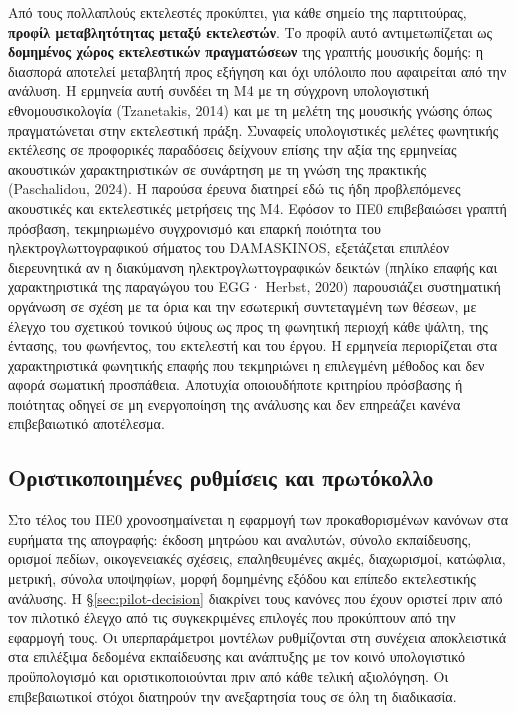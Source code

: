 \documentclass[11pt,a4paper]{article}
\begin{document}
Από τους πολλαπλούς εκτελεστές προκύπτει, για κάθε σημείο της παρτιτούρας, \textbf{προφίλ μεταβλητότητας μεταξύ εκτελεστών}. Το προφίλ αυτό αντιμετωπίζεται ως \textbf{δομημένος χώρος εκτελεστικών πραγματώσεων} της γραπτής μουσικής δομής: η διασπορά αποτελεί μεταβλητή προς εξήγηση και όχι υπόλοιπο που αφαιρείται από την ανάλυση. Η ερμηνεία αυτή συνδέει τη M4 με τη σύγχρονη υπολογιστική εθνομουσικολογία (Tzanetakis, 2014) και με τη μελέτη της μουσικής γνώσης όπως πραγματώνεται στην εκτελεστική πράξη. Συναφείς υπολογιστικές μελέτες φωνητικής εκτέλεσης σε προφορικές παραδόσεις δείχνουν επίσης την αξία της ερμηνείας ακουστικών χαρακτηριστικών σε συνάρτηση με τη γνώση της πρακτικής (Paschalidou, 2024). Η παρούσα έρευνα διατηρεί εδώ τις ήδη προβλεπόμενες ακουστικές και εκτελεστικές μετρήσεις της M4. Εφόσον το ΠΕ0 επιβεβαιώσει γραπτή πρόσβαση, τεκμηριωμένο συγχρονισμό και επαρκή ποιότητα του ηλεκτρογλωττογραφικού σήματος του DAMASKINOS, εξετάζεται επιπλέον διερευνητικά αν η διακύμανση ηλεκτρογλωττογραφικών δεικτών (πηλίκο επαφής και χαρακτηριστικά της παραγώγου του EGG· Herbst, 2020) παρουσιάζει συστηματική οργάνωση σε σχέση με τα όρια και την εσωτερική συντεταγμένη των θέσεων, με έλεγχο του σχετικού τονικού ύψους ως προς τη φωνητική περιοχή κάθε ψάλτη, της έντασης, του φωνήεντος, του εκτελεστή και του έργου. Η ερμηνεία περιορίζεται στα χαρακτηριστικά φωνητικής επαφής που τεκμηριώνει η επιλεγμένη μέθοδος και δεν αφορά σωματική προσπάθεια. Αποτυχία οποιουδήποτε κριτηρίου πρόσβασης ή ποιότητας οδηγεί σε μη ενεργοποίηση της ανάλυσης και δεν επηρεάζει κανένα επιβεβαιωτικό αποτέλεσμα.

\subsection{Οριστικοποιημένες ρυθμίσεις και πρωτόκολλο}\label{app:impl-config}

Στο τέλος του ΠΕ0 χρονοσημαίνεται η εφαρμογή των προκαθορισμένων κανόνων στα ευρήματα της απογραφής: έκδοση μητρώου και αναλυτών, σύνολο εκπαίδευσης, ορισμοί πεδίων, οικογενειακές σχέσεις, επαληθευμένες ακμές, διαχωρισμοί, κατώφλια, μετρική, σύνολα υποψηφίων, μορφή δομημένης εξόδου και επίπεδο εκτελεστικής ανάλυσης. Η \S\ref{sec:pilot-decision} διακρίνει τους κανόνες που έχουν οριστεί πριν από τον πιλοτικό έλεγχο από τις συγκεκριμένες επιλογές που προκύπτουν από την εφαρμογή τους. Οι υπερπαράμετροι μοντέλων ρυθμίζονται στη συνέχεια αποκλειστικά στα επιλέξιμα δεδομένα εκπαίδευσης και ανάπτυξης με τον κοινό υπολογιστικό προϋπολογισμό και οριστικοποιούνται πριν από κάθε τελική αξιολόγηση. Οι επιβεβαιωτικοί στόχοι διατηρούν την ανεξαρτησία τους σε όλη τη διαδικασία.
\end{document}
